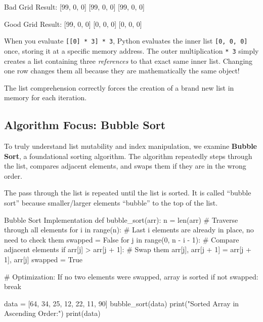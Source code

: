 \begin{outputbox}
Bad Grid Result:
[99, 0, 0]
[99, 0, 0]
[99, 0, 0]

Good Grid Result:
[99, 0, 0]
[0, 0, 0]
[0, 0, 0]
\end{outputbox}

\begin{conceptbox}
When you evaluate \texttt{[[0] * 3] * 3}, Python evaluates the inner list \texttt{[0, 0, 0]} once, storing it at a specific memory address. The outer multiplication \texttt{* 3} simply creates a list containing three \textit{references} to that exact same inner list. Changing one row changes them all because they are mathematically the same object!

The list comprehension correctly forces the creation of a brand new list in memory for each iteration.
\end{conceptbox}

\subsection{Algorithm Focus: Bubble Sort}

To truly understand list mutability and index manipulation, we examine \textbf{Bubble Sort}, a foundational sorting algorithm. The algorithm repeatedly steps through the list, compares adjacent elements, and swaps them if they are in the wrong order. 

The pass through the list is repeated until the list is sorted. It is called ``bubble sort'' because smaller/larger elements ``bubble'' to the top of the list.

\begin{pythoncode}[]{Bubble Sort Implementation}
def bubble_sort(arr):
    n = len(arr)
    # Traverse through all elements
    for i in range(n):
        # Last i elements are already in place, no need to check them
        swapped = False
        for j in range(0, n - i - 1):
            # Compare adjacent elements
            if arr[j] > arr[j + 1]:
                # Swap them
                arr[j], arr[j + 1] = arr[j + 1], arr[j]
                swapped = True
        
        # Optimization: If no two elements were swapped, array is sorted
        if not swapped:
            break
            
data = [64, 34, 25, 12, 22, 11, 90]
bubble_sort(data)
print("Sorted Array in Ascending Order:")
print(data)
\end{pythoncode}


